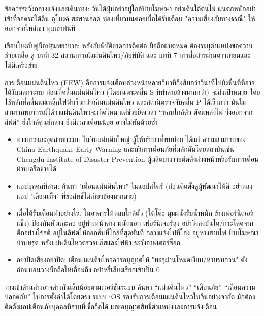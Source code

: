 ข้อควรระวังกลางแจ้งและเดินทาง: วันไต้ฝุ่นอย่าอยู่ใกล้ป้ายโฆษณา อย่าเดินใต้ต้นไม้ ฝนตกหนักอย่าเข้าที่จอดรถใต้ดิน อุโมงค์ สะพานลอด ท่องเที่ยวบนดอยเมื่อได้รับเตือน "ความเสี่ยงภัยทางธรณี" ให้ออกจากไหล่เขา หุบเขาทันที

เชื่อมโยงกับคู่มือปฐมพยาบาล: หลังภัยพิบัติขาดการติดต่อ มือถือแบตหมด ต้องระบุตำแหน่งขอความช่วยเหลือ ดู บทที่ 32 สถานการณ์แผ่นดินไหว/ภัยพิบัติ และ บทที่ 7 การสื่อสารผ่านดาวเทียมและไม่มีเครือข่าย


การเตือนแผ่นดินไหว (EEW) คือการแจ้งเตือนล่วงหน้าหลายวินาทีถึงสิบกว่าวินาทีไปยังพื้นที่ที่อาจได้รับผลกระทบ ก่อนที่คลื่นแผ่นดินไหว (โดยเฉพาะคลื่น S ที่ทำลายล้างมากกว่า) จะถึงเป้าหมาย โดยใช้หลักที่คลื่นแม่เหล็กไฟฟ้าเร็วกว่าคลื่นแผ่นดินไหว และสถานีตรวจจับคลื่น P ได้เร็วกว่า มันไม่สามารถพยากรณ์ได้ว่าแผ่นดินไหวจะเกิดไหม แต่ช่วยยืดเวลา “หลบใกล้ตัว ตัดแหล่งไฟ วิ่งออกจากลิฟต์” ยิ่งใกล้ศูนย์กลาง ยิ่งมีเวลาเตือนน้อย อาจไม่ทันด้วยซ้ำ

\begin{itemize}
  \item ทางการและอุตสาหกรรม: ในจีนแผ่นดินใหญ่ ผู้ให้บริการที่พบบ่อย ได้แก่ ความสามารถของ China Earthquake Early Warning และบริการเตือนภัยที่ผลักดันโดยสถาบันเช่น Chengdu Institute of Disaster Prevention ผู้ผลิตบางรายติดตั้งล่วงหน้าหรือรับการเตือนผ่านเครือข่ายได้
  \item แอปบุคคลที่สาม: ค้นหา "เตือนแผ่นดินไหว" ในแอปสโตร์ (ก่อนติดตั้งดูผู้พัฒนาให้ดี อย่าหลงแอป "เตือนเท็จ" ที่ขอสิทธิ์ไม่เกี่ยวข้องมากมาย)
  \item เมื่อได้รับเตือนทำอย่างไร: ในอาคารให้หลบใกล้ตัว (ใต้โต๊ะ มุมผนังรับน้ำหนัก ข้างเฟอร์นิเจอร์แข็ง) ป้องกันหัวและคอ อยู่ห่างหน้าต่าง ผนังนอก เฟอร์นิเจอร์สูง อย่าวิ่งลงบันได/กระโดดจากตึกอย่างไร้สติ อยู่ในลิฟต์ให้ออกชั้นที่ใกล้ที่สุดทันที กลางแจ้งไปที่โล่ง อยู่ห่างสายไฟ ป้ายโฆษณา บ้านทรุด หลังแผ่นดินไหวตรวจแก๊สและไฟฟ้า ระวังอาฟเตอร์ช็อก
  \item อย่าปิดเสียงอย่าปิด: เตือนแผ่นดินไหวควรอนุญาตให้ "ทะลุผ่านโหมดเงียบ/ห้ามรบกวน" ดัง ก่อนนอนวางมือถือให้เอื้อมถึง อย่าหรี่เสียงเรียกเข้าเป็น 0
\end{itemize}


ทางเข้าด้านล่างอาจต่างกันเล็กน้อยตามเวอร์ชันระบบ ค้นหา “แผ่นดินไหว” “เตือนภัย” “เตือนความปลอดภัย” ในการตั้งค่าได้โดยตรง ระบบ iOS รองรับการเตือนแผ่นดินไหวในจีนอย่างจำกัด มักต้องติดตั้งแอปเตือนภัยบุคคลที่สามที่เชื่อถือได้ และอนุญาตสิทธิ์ตำแหน่งและการแจ้งเตือน

